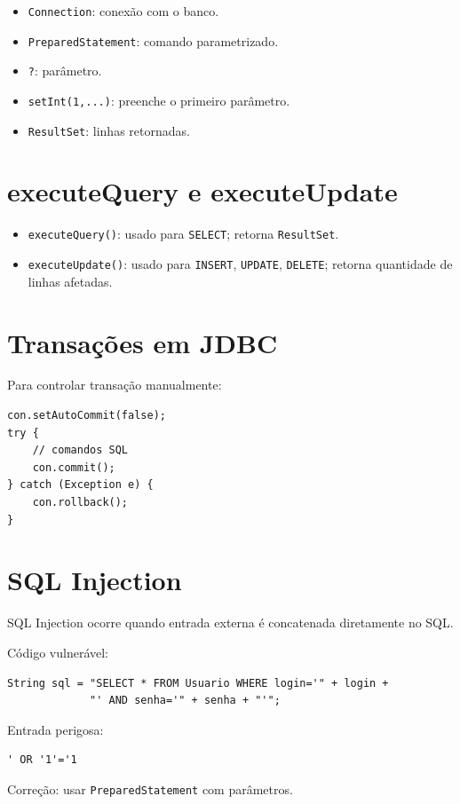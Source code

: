 \documentclass[12pt,a4paper]{article}
\begin{document}
\begin{itemize}
    \item \texttt{Connection}: conexão com o banco.
    \item \texttt{PreparedStatement}: comando parametrizado.
    \item \texttt{?}: parâmetro.
    \item \texttt{setInt(1,...)}: preenche o primeiro parâmetro.
    \item \texttt{ResultSet}: linhas retornadas.
\end{itemize}

\section{executeQuery e executeUpdate}
\begin{itemize}
    \item \texttt{executeQuery()}: usado para \texttt{SELECT}; retorna \texttt{ResultSet}.
    \item \texttt{executeUpdate()}: usado para \texttt{INSERT}, \texttt{UPDATE}, \texttt{DELETE}; retorna quantidade de linhas afetadas.
\end{itemize}

\section{Transações em JDBC}
Para controlar transação manualmente:
\begin{verbatim}
con.setAutoCommit(false);
try {
    // comandos SQL
    con.commit();
} catch (Exception e) {
    con.rollback();
}
\end{verbatim}

\section{SQL Injection}
SQL Injection ocorre quando entrada externa é concatenada diretamente no SQL.

Código vulnerável:
\begin{verbatim}
String sql = "SELECT * FROM Usuario WHERE login='" + login +
             "' AND senha='" + senha + "'";
\end{verbatim}

Entrada perigosa:
\begin{verbatim}
' OR '1'='1
\end{verbatim}

Correção: usar \texttt{PreparedStatement} com parâmetros.
\end{document}
